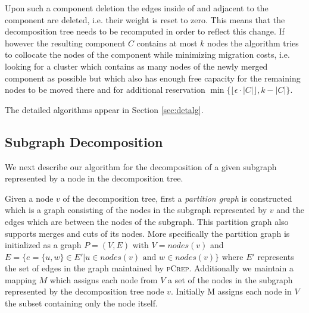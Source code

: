 \documentclass[a4paper,UKenglish,cleveref, autoref, thm-restate,authorcolumns]{lipics-v2019}
\newcommand{\adjDel}{\textsc{pCrep}}
\begin{document}
Upon such a component deletion the edges inside of and adjacent to the component are deleted, i.e. their weight is reset to zero. This means that the decomposition tree needs to be recomputed in order to reflect this change.
If however the resulting component $C$ contains at most $k$ nodes the algorithm tries to collocate the nodes of the component while minimizing migration costs, i.e. looking for a cluster which contains as many nodes of the newly merged component as possible but which also has enough free capacity for the remaining nodes to be moved there and for additional reservation $\min\{\lfloor\epsilon\cdot|C|\rfloor,k-|C|\}$.


The detailed algorithms appear in Section
\ref{sec:detalg}.

\subsection{Subgraph Decomposition}
\label{decomp_desc}

We next describe our algorithm for the decomposition of a given subgraph represented by a node in the decomposition tree. 

Given a node $v$ of the decomposition tree, first a \textit{partition graph} is constructed which is a graph consisting of the nodes in the subgraph represented by $v$ and the edges which are between the nodes of the subgraph. This partition graph also supports merges and cuts of its nodes. More specifically the partition graph is initialized as a graph $P=(V,E)$ with $V=nodes(v)$ and $E=\{e=\{u,w\}\in E'|u\in nodes(v)\text{ and }w\in nodes(v)\}$ where $E'$ represents the set of edges in the graph maintained by \adjDel{}. Additionally we maintain a mapping $M$ which assigns each node from $V$ a set of the nodes in the subgraph represented by the decomposition tree node $v$. Initially M assigns each node in $V$ the subset containing only the node itself.
\end{document}
